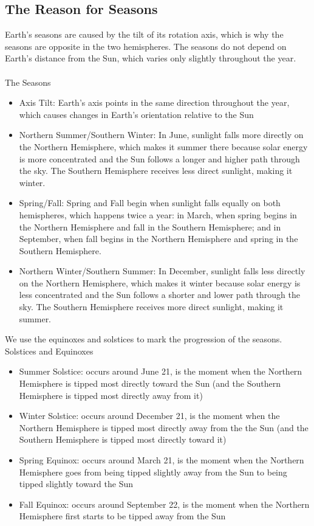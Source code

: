 \documentclass[12pt]{article}
\begin{document}
\subsection{The Reason for Seasons} 
Earth's seasons are caused by the tilt of its rotation axis, which is why the seasons are opposite in the two hemispheres. The seasons do not depend on Earth's distance from the Sun, which varies only slightly throughout the year. \\~\\
The Seasons \begin{itemize} 
\item Axis Tilt: Earth's axis points in the same direction throughout the year, which causes changes in Earth's orientation relative to the Sun
\item Northern Summer/Southern Winter: In June, sunlight falls more directly on the Northern Hemisphere, which makes it summer there because solar energy is more concentrated and the Sun follows a longer and higher path through the sky. The Southern Hemisphere receives less direct sunlight, making it winter. 
\item Spring/Fall: Spring and Fall begin when sunlight falls equally on both hemispheres, which happens twice a year: in March, when spring begins in the Northern Hemisphere and fall in the Southern Hemisphere; and in September, when fall begins in the Northern Hemisphere and spring in the Southern Hemisphere.
\item Northern Winter/Southern Summer: In December, sunlight falls less directly on the Northern Hemisphere, which makes it winter because solar energy is less concentrated and the Sun follows a shorter and lower path through the sky. The Southern Hemisphere receives more direct sunlight, making it summer. \end{itemize} 
We use the equinoxes and solstices to mark the progression of the seasons. \newline
Solstices and Equinoxes \begin{itemize} 
\item Summer Solstice: occurs around June 21, is the moment when the Northern Hemisphere is tipped most directly toward the Sun (and the Southern Hemisphere is tipped most directly away from it)
\item Winter Solstice: occurs around December 21, is the moment when the Northern Hemisphere is tipped most directly away from the the Sun (and the Southern Hemisphere is tipped most directly toward it) 
\item Spring Equinox: occurs around March 21, is the moment when the Northern Hemisphere goes from being tipped slightly away from the Sun to being tipped slightly toward the Sun
\item Fall Equinox: occurs around September 22, is the moment when the Northern Hemisphere first starts to be tipped away from the Sun \end{itemize} 
\end{document}
